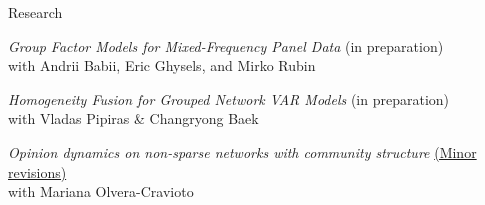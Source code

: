 \documentclass{resume} %
\begin{document}
\begin{rSection}{Research} 

\textit{Group Factor Models for Mixed-Frequency Panel Data} (in preparation) \\ 
with Andrii Babii, Eric Ghysels, and Mirko Rubin

\textit{Homogeneity Fusion for Grouped Network VAR Models} (in preparation) \\ 
    with Vladas Pipiras \& Changryong Baek
    
\textit{Opinion dynamics on non-sparse networks with community structure} \href{https://arxiv.org/abs/2401.04598}{(Minor revisions)} \\ with Mariana Olvera-Cravioto

\end{rSection}
\end{document}
